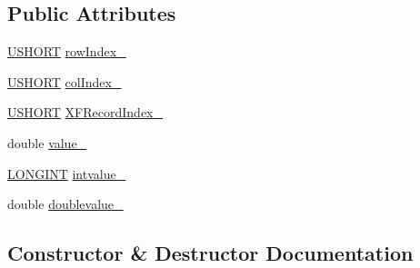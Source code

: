 \subsection*{Public Attributes}
\begin{DoxyCompactItemize}
\item 
\hyperlink{_basic_excel_8hpp_a5850d5316caf7f4cedd742fdf8cd7c02}{U\+S\+H\+O\+R\+T} \hyperlink{struct_y_excel_1_1_worksheet_1_1_cell_table_1_1_row_block_1_1_cell_block_1_1_number_a830ecaac78bd3a83d4551d3c1e461a44}{row\+Index\+\_\+}
\item 
\hyperlink{_basic_excel_8hpp_a5850d5316caf7f4cedd742fdf8cd7c02}{U\+S\+H\+O\+R\+T} \hyperlink{struct_y_excel_1_1_worksheet_1_1_cell_table_1_1_row_block_1_1_cell_block_1_1_number_ae045d9e4b12d5fc5f3596c2574b0618e}{col\+Index\+\_\+}
\item 
\hyperlink{_basic_excel_8hpp_a5850d5316caf7f4cedd742fdf8cd7c02}{U\+S\+H\+O\+R\+T} \hyperlink{struct_y_excel_1_1_worksheet_1_1_cell_table_1_1_row_block_1_1_cell_block_1_1_number_a1992bc8ab123143b03701c3202d108fc}{X\+F\+Record\+Index\+\_\+}
\item 
double \hyperlink{struct_y_excel_1_1_worksheet_1_1_cell_table_1_1_row_block_1_1_cell_block_1_1_number_a55358ff66e8115debc5dd434d3b82fb9}{value\+\_\+}
\item 
\hyperlink{_p_lto_q_b_2_basic_excel_8hpp_a41a6a848ac1750ea79579492320f45b6}{L\+O\+N\+G\+I\+N\+T} \hyperlink{struct_y_excel_1_1_worksheet_1_1_cell_table_1_1_row_block_1_1_cell_block_1_1_number_a37154837734abe4acb64d59ea2f595c5}{intvalue\+\_\+}
\item 
double \hyperlink{struct_y_excel_1_1_worksheet_1_1_cell_table_1_1_row_block_1_1_cell_block_1_1_number_a91a931dd0709787c671bf40d7682232d}{doublevalue\+\_\+}
\end{DoxyCompactItemize}


\subsection{Constructor \& Destructor Documentation}
\hypertarget{struct_y_excel_1_1_worksheet_1_1_cell_table_1_1_row_block_1_1_cell_block_1_1_number_ae942b947f6e08da3f49cf8ff5e0f27b3}{}
